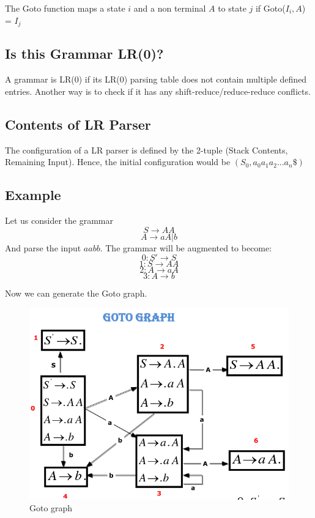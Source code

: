 \documentclass[12pt,letterpaper]{amsbook}
\theoremstyle{definition}
\begin{document}
The Goto function maps a state $i$ and a non terminal $A$ to state $j$ if Goto($I_i,A$) = $I_j$

\subsection{Is this Grammar LR(0)?} 

A grammar is LR(0) if its LR(0) parsing table does not contain multiple defined entries. Another way is to check if it has any shift-reduce/reduce-reduce conflicts.

\subsection{Contents of LR Parser}

The configuration of a LR parser is defined by the 2-tuple (Stack Contents, Remaining Input). Hence, the initial configuration would be $(S_0,a_0a_1a_2...a_n\$)$

\subsection{Example}

Let us consider the grammar
\[S \rightarrow AA\]
\[A \rightarrow aA|b\]
And parse the input $aabb$. The grammar will be augmented to become:
\[0:S' \rightarrow S\]
\[1:S \rightarrow AA\]
\[2:A \rightarrow aA\]
\[3:A \rightarrow b\]

Now we can generate the Goto graph.

\begin{figure}[htpb]
  \centering
  \includegraphics[width=0.8\linewidth]{./assets/goto_graph_example.png}
  \caption{Goto graph}%
  \label{fig:}
\end{figure}
\end{document}
